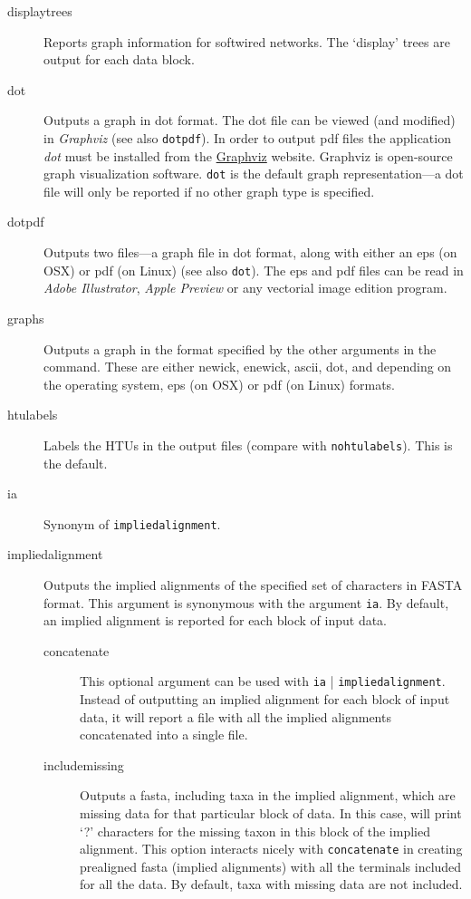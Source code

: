 \begin{description}
		\item[displaytrees] Reports graph information for softwired networks. The 
		`display' trees are output for each data block. 
		
		\item[dot] Outputs a graph in dot format. The dot file can be viewed (and 
		modified) in \textit{Graphviz} (see also \texttt{dotpdf}). In order to output pdf 
		files the application \textit{dot} must be installed from the 
		\href{https://graphviz.org/download/}{Graphviz} 	website. Graphviz is 
		open-source graph visualization software. \texttt{dot} is the default graph 
		representation---a dot file will only be reported if no 
		other graph type is specified. 
		
		\item[dotpdf] Outputs two files---a graph file in dot format, along with either
		an eps (on OSX) or pdf (on Linux) (see also \texttt{dot}). The eps and pdf 
		files can be read in \textit{Adobe Illustrator}, \textit{Apple Preview} or any 
		vectorial image edition program.
		
		\item[graphs] Outputs a graph in the format specified by the other arguments 
		in the command. These are either newick, enewick, ascii, dot, and depending 
		on the operating system, eps (on OSX) or pdf (on Linux) formats.
		
		\item[htulabels] Labels the HTUs in the output files (compare with 
		\texttt{nohtulabels}). This is the default.
		
		\item[ia] Synonym of \texttt{impliedalignment}.
		
		\item[impliedalignment] Outputs the implied alignments of the specified 
		set of characters in FASTA format. This argument is synonymous with 
		the argument \texttt{ia}. By default, an implied alignment is reported for 
		each block of input data. 
		
		\begin{description}
			\item[concatenate] This optional argument can be used with \texttt{ia}
			| \texttt{impliedalignment}. Instead of outputting an implied alignment 
			for each block of input data, it will report a file with all the implied 
			alignments concatenated into a single file.
			
			\item[includemissing] Outputs a fasta, including taxa in the implied
			alignment, which are missing data for that particular block of data.
			In this case, \phyg will print `?' characters for the missing taxon in 
			this block of the implied alignment. This option interacts nicely with 
			\texttt{concatenate} in creating prealigned fasta (implied alignments) 
			with all the terminals included for all the data. By default, taxa with 
			missing data are not included.
			

\end{description}
\end{description}
